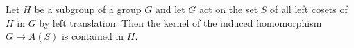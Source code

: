 Let $H$ be a subgroup of a group $G$ and let $G$ act on the set $S$ of all left cosets of $H$ in $G$ by left translation. Then the kernel of the induced homomorphism $G \to A(S)$ is contained in $H$.
